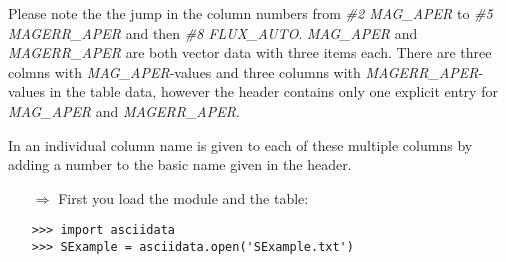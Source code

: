 Please note the the jump in the column numbers from {\sl \#2 MAG\_APER} to
{\sl \#5 MAGERR\_APER} and then {\sl \#8 FLUX\_AUTO}. {\it MAG\_APER} and
{\it MAGERR\_APER} are both vector data with three items each.
There are three colmns with {\it MAG\_APER}-values and three columns with
{\it MAGERR\_APER}-values in the table data, however the header contains
only one explicit entry for {\it MAG\_APER} and {\it MAGERR\_APER}.

In \AAD an individual column name is given to each of these multiple columns
by adding a number to the basic name given in the header.

\begin{itemize}
\item[$\Rightarrow$] First you load the \AAD module and the table:
\begin{verbatim}
>>> import asciidata
>>> SExample = asciidata.open('SExample.txt')
\end{verbatim}


\end{itemize}
